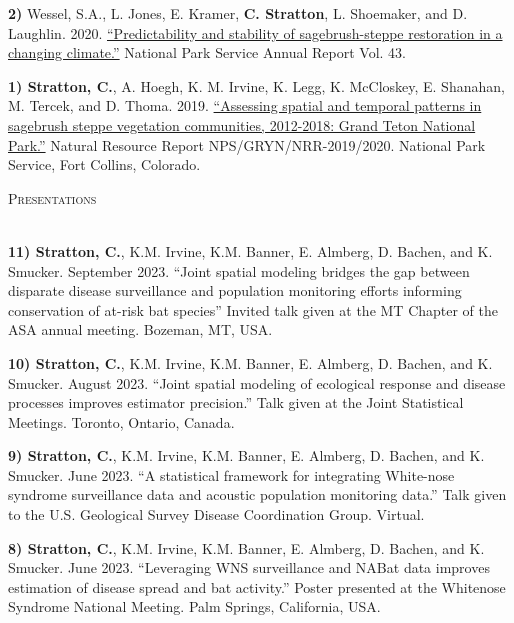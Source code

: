 \documentclass[a4paper]{article}
\newcommand{\lineunder} {
	\vspace*{-8pt} \\
	\hspace*{-18pt} \hrulefill \\
}
\newcommand{\header} [1] {
	{\hspace*{-18pt}\vspace*{6pt} \textcolor{Cerulean}{\textsc{#1}}}
	\vspace*{-6pt} \textcolor{Cerulean}{\lineunder}
}
\begin{document}
\textbf{2)} Wessel, S.A., L. Jones, E. Kramer, \textbf{C. Stratton}, L.
Shoemaker, and D. Laughlin. 2020.
\href{https://journals.uwyo.edu/index.php/uwnpsrc/article/view/6791/6301}{``Predictability
and stability of sagebrush-steppe restoration in a changing climate.''}
National Park Service Annual Report Vol. 43. \vspace*{2mm}

\textbf{1) Stratton, C.}, A. Hoegh, K. M. Irvine, K. Legg, K. McCloskey,
E. Shanahan, M. Tercek, and D. Thoma. 2019.
\href{https://irma.nps.gov/DataStore/DownloadFile/631136}{``Assessing
spatial and temporal patterns in sagebrush steppe vegetation
communities, 2012-2018: Grand Teton National Park.''} Natural Resource
Report NPS/GRYN/NRR-2019/2020. National Park Service, Fort Collins,
Colorado. \vspace*{2mm}

\header{Presentations}
\vspace*{2mm}

\textbf{11) Stratton, C.}, K.M. Irvine, K.M. Banner, E. Almberg, D.
Bachen, and K. Smucker. September 2023. ``Joint spatial modeling bridges
the gap between disparate disease surveillance and population monitoring
efforts informing conservation of at-risk bat species'' Invited talk
given at the MT Chapter of the ASA annual meeting. Bozeman, MT, USA.
\vspace*{2mm}

\textbf{10) Stratton, C.}, K.M. Irvine, K.M. Banner, E. Almberg, D.
Bachen, and K. Smucker. August 2023. ``Joint spatial modeling of
ecological response and disease processes improves estimator
precision.'' Talk given at the Joint Statistical Meetings. Toronto,
Ontario, Canada. \vspace*{2mm}

\textbf{9) Stratton, C.}, K.M. Irvine, K.M. Banner, E. Almberg, D.
Bachen, and K. Smucker. June 2023. ``A statistical framework for
integrating White-nose syndrome surveillance data and acoustic
population monitoring data.'' Talk given to the U.S. Geological Survey
Disease Coordination Group. Virtual. \vspace*{2mm}

\textbf{8) Stratton, C.}, K.M. Irvine, K.M. Banner, E. Almberg, D.
Bachen, and K. Smucker. June 2023. ``Leveraging WNS surveillance and
NABat data improves estimation of disease spread and bat activity.''
Poster presented at the Whitenose Syndrome National Meeting. Palm
Springs, California, USA. \vspace*{2mm}
\end{document}
